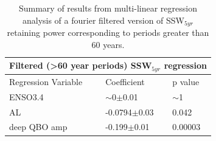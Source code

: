 \begin{table}
\centering
\begin{tabular}{|p{3cm}||p{3cm}|p{3cm}|}
 \hline
 \multicolumn{3}{|c|}{Filtered (>60 year periods) SSW$_{5yr}$ regression}\\
 \hline
 Regression Variable& Coefficient& p value\\
 \hline
 ENSO3.4  &   $\sim$0$\pm$0.01  & $\sim$1\\
 AL & -0.0794$\pm$0.03& 0.042\\
 deep QBO amp &-0.199$\pm$0.01&0.00003\\
 \hline
\end{tabular}
\begin{center}
\caption{Summary of results from multi-linear regression analysis of a fourier filtered  version of SSW$_{5yr}$ retaining power corresponding to periods greater than 60 years.}  
\end{center}
\end{table}
